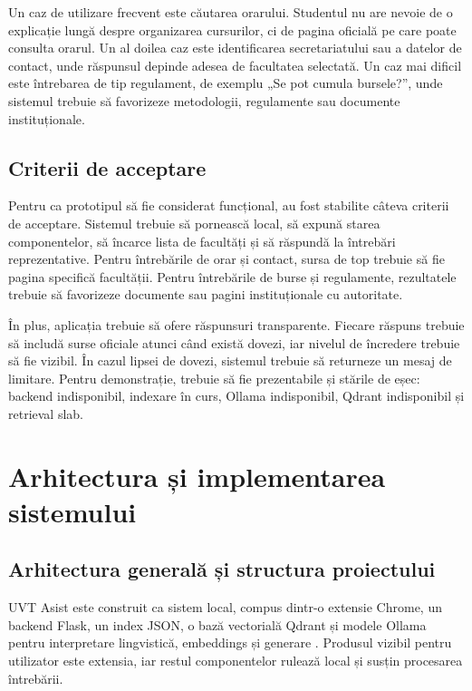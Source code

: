 \documentclass[12pt,a4paper]{report}
\theoremstyle{definition}
\theoremstyle{remark}
\begin{document}
Un caz de utilizare frecvent este căutarea orarului. Studentul nu are nevoie de o explicație lungă despre organizarea cursurilor, ci de pagina oficială pe care poate consulta orarul. Un al doilea caz este identificarea secretariatului sau a datelor de contact, unde răspunsul depinde adesea de facultatea selectată. Un caz mai dificil este întrebarea de tip regulament, de exemplu „Se pot cumula bursele?”, unde sistemul trebuie să favorizeze metodologii, regulamente sau documente instituționale.

\section{Criterii de acceptare}
Pentru ca prototipul să fie considerat funcțional, au fost stabilite câteva criterii de acceptare. Sistemul trebuie să pornească local, să expună starea componentelor, să încarce lista de facultăți și să răspundă la întrebări reprezentative. Pentru întrebările de orar și contact, sursa de top trebuie să fie pagina specifică facultății. Pentru întrebările de burse și regulamente, rezultatele trebuie să favorizeze documente sau pagini instituționale cu autoritate.

În plus, aplicația trebuie să ofere răspunsuri transparente. Fiecare răspuns trebuie să includă surse oficiale atunci când există dovezi, iar nivelul de încredere trebuie să fie vizibil. În cazul lipsei de dovezi, sistemul trebuie să returneze un mesaj de limitare. Pentru demonstrație, trebuie să fie prezentabile și stările de eșec: backend indisponibil, indexare în curs, Ollama indisponibil, Qdrant indisponibil și retrieval slab.

\chapter{Arhitectura și implementarea sistemului}

\section{Arhitectura generală și structura proiectului}
UVT Asist este construit ca sistem local, compus dintr-o extensie Chrome, un backend Flask, un index JSON, o bază vectorială Qdrant și modele Ollama pentru interpretare lingvistică, embeddings și generare \cite{ChromeMV3,FlaskDocs,QdrantDocs,OllamaDocs}. Produsul vizibil pentru utilizator este extensia, iar restul componentelor rulează local și susțin procesarea întrebării.
\end{document}
